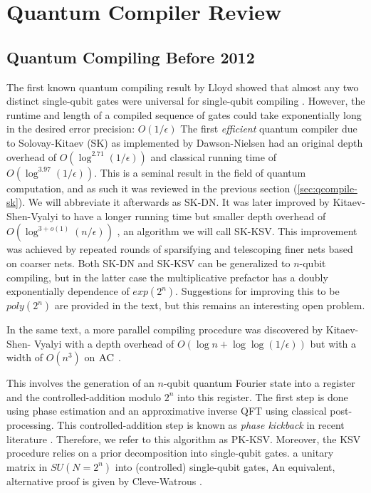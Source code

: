 \section{Quantum Compiler Review}
\label{sec:qcompile-review}

\subsection{Quantum Compiling Before 2012}
\label{subsec:qcompiile-pre2012}

The first known quantum compiling result by Lloyd showed that almost any two
distinct single-qubit gates were universal for single-qubit compiling
\cite{Lloyd1995}. However, the runtime and length of a compiled sequence of gates
could take exponentially long in the desired error precision: $O(1/\epsilon)$
The first \emph{efficient} quantum compiler due to
Solovay-Kitaev (SK) as implemented by Dawson-Nielsen had an original depth overhead
of $O(\log^{2.71}(1/\epsilon))$ and classical
running time of $O(\log^{3.97}(1/\epsilon))$. This is a seminal result in
the field of quantum computation, and as such it was reviewed in the previous
section (\ref{sec:qcompile-sk}). We will abbreviate it afterwards as SK-DN.
It was later improved by Kitaev-Shen-Vyalyi
to have a longer running time but smaller depth overhead of $O(\log^{3+o(1)}(n/\epsilon))$
\cite{Kitaev2002}, an algorithm we will call SK-KSV.
This improvement was achieved by repeated rounds of sparsifying and
telescoping finer nets based on coarser nets. Both SK-DN and SK-KSV can be
generalized to $n$-qubit compiling, but in the latter case the multiplicative
prefactor has a doubly exponentially dependence of $exp(2^n)$. Suggestions
for improving this to be $poly(2^n)$ are provided in the text, but this remains
an interesting open problem.

In the same text, a more parallel compiling procedure was discovered by Kitaev-Shen-
Vyalyi with a depth overhead of $O(\log n + \log\log(1/\epsilon))$ but
with a width of $O(n^3)$ on $\textsc{AC}$ \cite{Kitaev2002}.

This involves the generation of an $n$-qubit quantum Fourier state into a register
and the controlled-addition
modulo $2^n$ into this register. The first step is done using phase estimation
and an approximative inverse QFT using classical post-processing.
This controlled-addition step is known as
\emph{phase kickback} in recent literature \cite{Jones2012}. Therefore, we
refer to this algorithm as PK-KSV.
Moreover, the KSV procedure relies on a prior decomposition into
single-qubit gates.
a unitary matrix in $SU(N=2^n)$ into (controlled) single-qubit gates,
An equivalent, alternative proof is given by Cleve-Watrous \cite{Cleve2000}.

